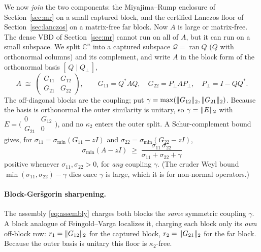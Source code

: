 \documentclass[11pt]{article}
\newcommand{\C}{\mathbb{C}}
\newcommand{\sig}{\sigma}
\newcommand{\sigmin}{\sigma_{\min}}
\DeclarePairedDelimiter{\norm}{\lVert}{\rVert}
\begin{document}
We now \emph{join} the two components: the Miyajima--Rump enclosure of Section~\ref{sec:mr} on a small
captured block, and the certified Lanczos floor of Section~\ref{sec:lanczos} on a matrix-free far
block. Now $A$ is large or matrix-free. The dense VBD of Section~\ref{sec:mr} cannot run on all of $A$,
but it can run on a small subspace. We split $\C^n$ into a captured subspace $\mathcal Q=\operatorname{ran}Q$
($Q$ with orthonormal columns) and its complement, and write $A$ in the block form of the orthonormal
basis $[\,Q\mid Q_\perp\,]$,
\begin{equation}\label{eq:2block}
  A \;\cong\; \begin{pmatrix} G_{11} & G_{12}\\ G_{21} & G_{22}\end{pmatrix},\qquad
  G_{11}=Q^*AQ,\quad G_{22}=P_\perp A P_\perp,\quad P_\perp=I-QQ^*.
\end{equation}
The off-diagonal blocks are the coupling; put $\gamma=\max(\norm{G_{12}}_2,\norm{G_{21}}_2)$. Because
the basis is orthonormal the outer similarity is unitary, so $\gamma=\norm{E}_2$ with
$E=\big(\begin{smallmatrix}0&G_{12}\\G_{21}&0\end{smallmatrix}\big)$, and no $\kappa_2$ enters the
outer split. A Schur-complement bound gives, for $\sig_{11}=\sigmin(G_{11}-zI)$ and
$\sig_{22}=\sigmin(G_{22}-zI)$,
\begin{equation}\label{eq:assembly}
  \boxed{\;\sigmin(A-zI)\;\ge\;\frac{\sig_{11}\,\sig_{22}}{\sig_{11}+\sig_{22}+\gamma}\;}
\end{equation}
positive whenever $\sig_{11},\sig_{22}>0$, for \emph{any} coupling $\gamma$. (The cruder Weyl bound
$\min(\sig_{11},\sig_{22})-\gamma$ dies once $\gamma$ is large, which it is for non-normal operators.)

\paragraph{Block-Ger\v sgorin sharpening.} The assembly \eqref{eq:assembly} charges both blocks the
\emph{same} symmetric coupling $\gamma$. A block analogue of Feingold--Varga localizes it, charging
each block only its \emph{own} off-block row: $r_1=\norm{G_{12}}_2$ for the captured block, $r_2=\norm{G_{21}}_2$
for the far block. Because the outer basis is unitary this floor is $\kappa_2$-free.
\end{document}
